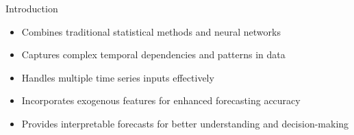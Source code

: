 
				
\begin{frame}{Introduction}
\begin{itemize}
	\item Combines traditional statistical methods and neural networks
	\item Captures complex temporal dependencies and patterns in data
	\item Handles multiple time series inputs effectively
	\item Incorporates exogenous features for enhanced forecasting accuracy
	\item Provides interpretable forecasts for better understanding and decision-making
\end{itemize}
\end{frame}

